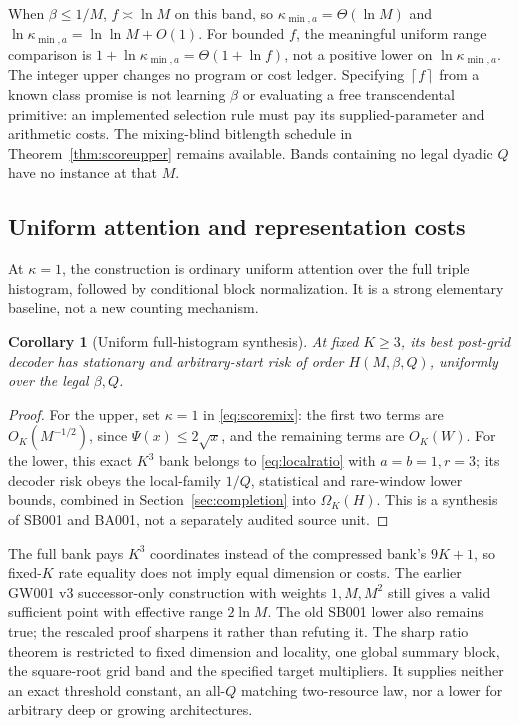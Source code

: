 \documentclass[11pt,letterpaper]{article}
\newtheorem{corollary}[theorem]{Corollary}
\theoremstyle{definition}\newtheorem{definition}[theorem]{Definition}
\theoremstyle{remark}\newtheorem{remark}[theorem]{Remark}
\newcommand{\ceil}[1]{\left\lceil #1\right\rceil}
\newcommand{\unit}[1]{\textsf{#1}}
\begin{document}
When $\beta\le1/M$, $f\asymp\ln M$ on this band, so $\kappa_{\min,a}=\Theta(\ln M)$ and $\ln\kappa_{\min,a}=\ln\ln M+O(1)$. For bounded $f$, the meaningful uniform range comparison is $1+\ln\kappa_{\min,a}=\Theta(1+\ln f)$, not a positive lower on $\ln\kappa_{\min,a}$. The integer upper changes no program or cost ledger. Specifying $\ceil f$ from a known class promise is not learning $\beta$ or evaluating a free transcendental primitive: an implemented selection rule must pay its supplied-parameter and arithmetic costs. The mixing-blind bitlength schedule in Theorem~\ref{thm:scoreupper} remains available. Bands containing no legal dyadic $Q$ have no instance at that $M$.

\subsection{Uniform attention and representation costs}
At $\kappa=1$, the construction is ordinary uniform attention over the full triple histogram, followed by conditional block normalization. It is a strong elementary baseline, not a new counting mechanism.
\begin{corollary}[Uniform full-histogram synthesis]\label{cor:hist}
At fixed $K\ge3$, its best post-grid decoder has stationary and arbitrary-start risk of order $H(M,\beta,Q)$, uniformly over the legal $\beta,Q$.
\end{corollary}
\begin{proof}
For the upper, set $\kappa=1$ in \eqref{eq:scoremix}: the first two terms are $O_K(M^{-1/2})$, since $\Psi(x)\le2\sqrt x$, and the remaining terms are $O_K(W)$. For the lower, this exact $K^3$ bank belongs to \eqref{eq:localratio} with $a=b=1,r=3$; its decoder risk obeys the local-family $1/Q$, statistical and rare-window lower bounds, combined in Section~\ref{sec:completion} into $\Omega_K(H)$. This is a synthesis of \unit{SB001} and \unit{BA001}, not a separately audited source unit.
\end{proof}

The full bank pays $K^3$ coordinates instead of the compressed bank's $9K+1$, so fixed-$K$ rate equality does not imply equal dimension or costs. The earlier \unit{GW001 v3} successor-only construction with weights $1,M,M^2$ still gives a valid sufficient point with effective range $2\ln M$. The old \unit{SB001} lower also remains true; the rescaled proof sharpens it rather than refuting it. The sharp ratio theorem is restricted to fixed dimension and locality, one global summary block, the square-root grid band and the specified target multipliers. It supplies neither an exact threshold constant, an all-$Q$ matching two-resource law, nor a lower for arbitrary deep or growing architectures.
\end{document}

